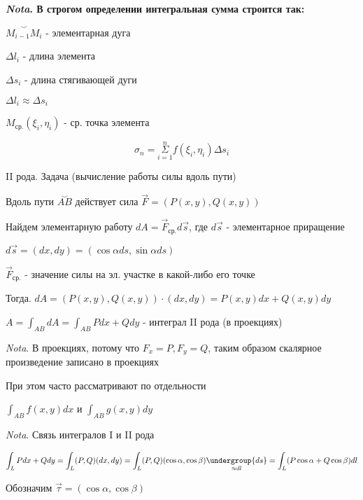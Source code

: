 \documentclass[12pt]{article}
\begin{document}
    
    \vspace{5mm}
    \textbf{\vspace{3mm}
\textit{Nota}. В строгом определении интегральная сумма строится так:}

    $\overset{\smile}{M_{i-1}M_i}$ - элементарная дуга

    $\Delta l_i$ - длина элемента

    $\Delta s_i$ - длина стягивающей дуги

    $\Delta l_i \approx \Delta s_i$

    $M_{\text{ср.}}(\xi_i, \eta_i)$ - ср. точка элемента

    \[\sigma_n = \overset{n}{\underset{i = 1}{\Sigma}} f(\xi_i, \eta_i) \Delta s_i\]

    \vspace{10mm}

    II рода. Задача (вычисление работы силы вдоль пути)

    Вдоль пути $\overset{\smile}{AB}$ действует сила $\overrightarrow{F} = (P(x, y), Q(x, y))$

    Найдем элементарную работу $dA = \overrightarrow{F}_{\text{ср.}} d\overrightarrow{s}$, где $d\overrightarrow{s}$ - элементарное приращение

    $d\overrightarrow{s} = (dx, dy) = (\cos\alpha ds, \sin\alpha ds)$

    $\overrightarrow{F}_{\text{ср.}}$ - значение силы на эл. участке в какой-либо его точке

    Тогда. $dA = (P(x, y), Q(x, y)) \cdot (dx, dy) = P(x, y)dx + Q(x, y)dy$

    $\displaystyle A = \int_{AB} dA = \int_{AB} Pdx + Qdy$ - интеграл II рода (в проекциях)

    \vspace{3mm}
\textit{Nota}. В проекциях, потому что $F_x = P, F_y = Q$, таким образом скалярное произведение записано в проекциях

    При этом часто рассматривают по отдельности

    $\displaystyle \int_{AB} f(x, y) dx$ и $\displaystyle \int_{AB} g(x, y) dy$

    \vspace{3mm}
\textit{Nota}. Связь интегралов I и II рода

    $\displaystyle \int_L Pdx + Qdy = \int_L (P, Q)(dx, dy) = \int_L (P, Q) (\cos\alpha, \cos\beta) \underset{\approx dl}{\undergroup{ds}} =
    \int_L (P\cos\alpha + Q\cos\beta)dl$

    Обозначим $\overrightarrow{\tau} = (\cos\alpha, \cos\beta)$
\end{document}
